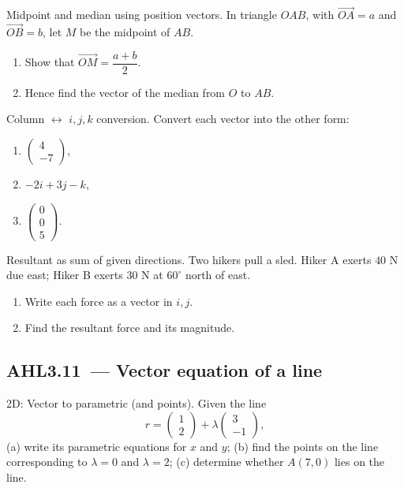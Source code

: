 \documentclass[11pt]{article}
\def\textbf#1{#1}%
\def\mathbf#1{#1}%
\newcommand{\tocsubsection}[1]{\subsection{#1}}
\newcounter{question}
\begin{document}
\begin{question}
\textbf{Midpoint and median using position vectors.}
In triangle $OAB$, with $\overrightarrow{OA}=\mathbf{a}$ and $\overrightarrow{OB}=\mathbf{b}$, let $M$ be the midpoint of $AB$.
\begin{enumerate}
  \item Show that $\overrightarrow{OM}=\dfrac{\mathbf{a}+\mathbf{b}}{2}$.
  \item Hence find the vector of the median from $O$ to $AB$.
\end{enumerate}
\end{question}

\begin{question}
\textbf{Column $\leftrightarrow$ $\mathbf{i},\mathbf{j},\mathbf{k}$ conversion.}
Convert each vector into the other form:
\begin{enumerate}
  \item $\begin{pmatrix}4\\-7\end{pmatrix}$,
  \item $-2\mathbf{i}+3\mathbf{j}-\mathbf{k}$,
  \item $\begin{pmatrix}0\\0\\5\end{pmatrix}$.
\end{enumerate}
\end{question}

\begin{question}
\textbf{Resultant as sum of given directions.}
Two hikers pull a sled. Hiker A exerts $40$ N due east; Hiker B exerts $30$ N at $60^\circ$ north of east.
\begin{enumerate}
  \item Write each force as a vector in $\mathbf{i},\mathbf{j}$.
  \item Find the resultant force and its magnitude.
\end{enumerate}
\end{question}



\tocsubsection{AHL3.11 — Vector equation of a line}


\begin{question}
\textbf{2D: Vector to parametric (and points).}
Given the line
\[
\mathbf{r}=\begin{pmatrix}1\\2\end{pmatrix}+\lambda\begin{pmatrix}3\\-1\end{pmatrix},
\]
(a) write its parametric equations for $x$ and $y$; (b) find the points on the line corresponding to $\lambda=0$ and $\lambda=2$; (c) determine whether $A(7,0)$ lies on the line.
\end{question}
\end{document}
